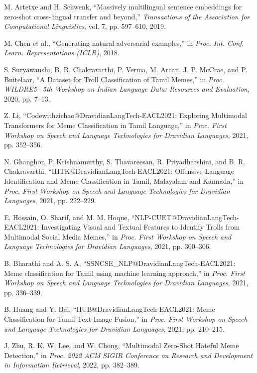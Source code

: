 \documentclass{ieeeaccess}
\begin{document}
\begin{thebibliography}{00}

 M. Artetxe and H. Schwenk, ``Massively multilingual sentence embeddings for zero-shot cross-lingual transfer and beyond,'' \emph{Transactions of the Association for Computational Linguistics}, vol. 7, pp. 597--610, 2019.

 M. Chen et al., ``Generating natural adversarial examples,'' in \emph{Proc. Int. Conf. Learn. Representations (ICLR)}, 2018.

 S. Suryawanshi, B. R. Chakravarthi, P. Verma, M. Arcan, J. P. McCrae, and P. Buitelaar, ``A Dataset for Troll Classification of Tamil Memes,'' in \emph{Proc. WILDRE5– 5th Workshop on Indian Language Data: Resources and Evaluation}, 2020, pp. 7--13.

 Z. Li, ``Codewithzichao@DravidianLangTech-EACL2021: Exploring Multimodal Transformers for Meme Classification in Tamil Language,'' in \emph{Proc. First Workshop on Speech and Language Technologies for Dravidian Languages}, 2021, pp. 352--356.

 N. Ghanghor, P. Krishnamurthy, S. Thavareesan, R. Priyadharshini, and B. R. Chakravarthi, ``IIITK@DravidianLangTech-EACL2021: Offensive Language Identification and Meme Classification in Tamil, Malayalam and Kannada,'' in \emph{Proc. First Workshop on Speech and Language Technologies for Dravidian Languages}, 2021, pp. 222--229.

 E. Hossain, O. Sharif, and M. M. Hoque, ``NLP-CUET@DravidianLangTech-EACL2021: Investigating Visual and Textual Features to Identify Trolls from Multimodal Social Media Memes,'' in \emph{Proc. First Workshop on Speech and Language Technologies for Dravidian Languages}, 2021, pp. 300--306.

 B. Bharathi and A. S. A, ``SSNCSE\_NLP@DravidianLangTech-EACL2021: Meme classification for Tamil using machine learning approach,'' in \emph{Proc. First Workshop on Speech and Language Technologies for Dravidian Languages}, 2021, pp. 336--339.

 B. Huang and Y. Bai, ``HUB@DravidianLangTech-EACL2021: Meme Classification for Tamil Text-Image Fusion,'' in \emph{Proc. First Workshop on Speech and Language Technologies for Dravidian Languages}, 2021, pp. 210--215.

 J. Zhu, R. K. W. Lee, and W. Chong, ``Multimodal Zero-Shot Hateful Meme Detection,'' in \emph{Proc. 2022 ACM SIGIR Conference on Research and Development in Information Retrieval}, 2022, pp. 382--389.


\end{thebibliography}
\end{document}
